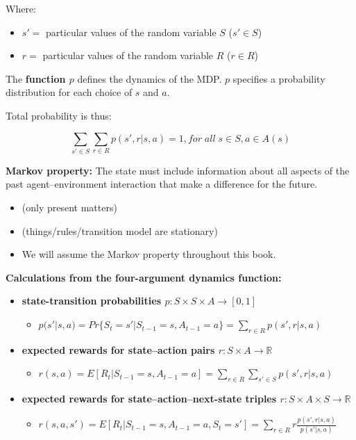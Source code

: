 \documentclass[12pt, a4paper]{article}
\begin{document}
Where:

\begin{itemize}
\item
  \(s' =\) particular values of the random variable \(S\) (\(s' \in S\))
\item
  \(r =\) particular values of the random variable \(R\) (\(r \in R\))
\end{itemize}

The \textbf{function \(p\)} defines the dynamics of the MDP. \(p\)
specifies a probability distribution for each choice of \(s\) and \(a\).

Total probability is thus:

\[\sum_{s' \in S} \sum_{r \in R} p(s', r|s, a) = 1, for\;all\;s \in S, a \in A(s)\]

\textbf{Markov property:} The state must include information about all
aspects of the past agent--environment interaction that make a
difference for the future.

\begin{itemize}
  \item (only present matters)
  \item (things/rules/transition model are stationary)
  \item We will assume the
  Markov property throughout this book.
\end{itemize}


\textbf{Calculations from the four-argument dynamics function:}

\begin{itemize}
\item
  \textbf{state-transition probabilities
  \(p : S \times S \times A \rightarrow [0, 1]\)}

  \begin{itemize}
  \item
    \(p(s'|s, a) = Pr\{S_t = s'| S_{t-1} = s, A_{t-1} = a\} = \sum_{r \in R} p(s', r|s, a)\)
  \end{itemize}
\item
  \textbf{expected rewards for state--action pairs
  \(r : S \times A \rightarrow \mathbb{R}\)}

  \begin{itemize}
  \item
    \(r(s,a) = E[R_t | S_{t-1}=s, A_{t-1}=a] = \sum_{r \in R} \sum_{s' \in S} p(s', r|s, a)\)
  \end{itemize}
\item
  \textbf{expected rewards for state--action--next-state triples
  \(r : S \times A \times S \rightarrow \mathbb{R}\)}

  \begin{itemize}
  \item
    \(r(s,a, s') = E[R_t | S_{t-1}=s, A_{t-1}=a, S_t = s'] = \sum_{r \in R} r \frac{p(s', r | s, a)}{p(s' | s, a)}\)
  \end{itemize}
\end{itemize}
\end{document}

